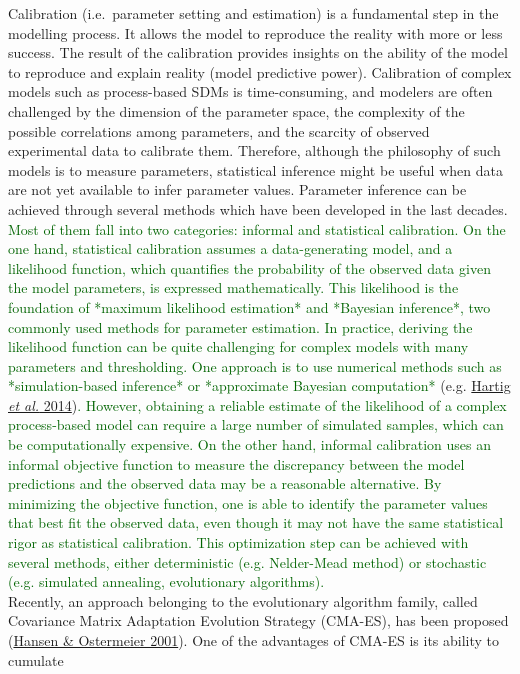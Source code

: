 \documentclass[11pt,]{article}
\begin{document}
Calibration (i.e.~parameter setting and estimation) is a fundamental
step in the modelling process. It allows the model to reproduce the
reality with more or less success. The result of the calibration
provides insights on the ability of the model to reproduce and explain
reality (model predictive power). Calibration of complex models such as
process-based SDMs is time-consuming, and modelers are often challenged
by the dimension of the parameter space, the complexity of the possible
correlations among parameters, and the scarcity of observed experimental
data to calibrate them. Therefore, although the philosophy of such
models is to measure parameters, statistical inference might be useful
when data are not yet available to infer parameter values. Parameter
inference can be achieved through several methods which have been
developed in the last decades.
\textcolor{darkgreen}{Most of them fall into two categories: informal and statistical calibration. On the one hand, statistical calibration assumes a data-generating model, and a likelihood function, which quantifies the probability of the observed data given the model parameters, is expressed mathematically. This likelihood is the foundation of *maximum likelihood estimation* and *Bayesian inference*, two commonly used methods for parameter estimation. In practice, deriving the likelihood function can be quite challenging for complex models with many parameters and thresholding. One approach is to use numerical methods such as *simulation-based inference* or *approximate Bayesian computation*}
(e.g. \protect\hyperlink{ref-Hartig2014}{Hartig \emph{et al.}
2014})\textcolor{darkgreen}{. However, obtaining a reliable estimate of the likelihood of a complex process-based model can require a large number of simulated samples, which can be computationally expensive. On the other hand, informal calibration uses an informal objective function to measure the discrepancy between the model predictions and the observed data may be a reasonable alternative. By minimizing the objective function, one is able to identify the parameter values that best fit the observed data, even though it may not have the same statistical rigor as statistical calibration. This optimization step can be achieved with several methods, either deterministic (e.g. Nelder-Mead method) or stochastic (e.g. simulated annealing, evolutionary algorithms).}\\
Recently, an approach belonging to the evolutionary algorithm family,
called Covariance Matrix Adaptation Evolution Strategy (CMA-ES), has
been proposed (\protect\hyperlink{ref-Hansen2001}{Hansen \& Ostermeier
2001}). One of the advantages of CMA-ES is its ability to cumulate
\end{document}
